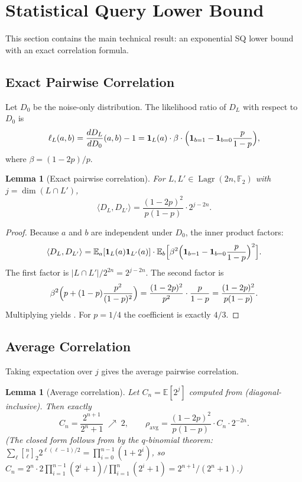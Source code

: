 \documentclass[11pt,a4paper]{article}
\theoremstyle{plain}
\newtheorem{lemma}[theorem]{Lemma}
\theoremstyle{definition}
\newcommand{\F}{\mathbb{F}}
\newcommand{\E}{\mathbb{E}}
\DeclareMathOperator{\Lagr}{Lagr}
\begin{document}
\section{Statistical Query Lower Bound}
\label{sec:sq}

This section contains the main technical result: an exponential SQ lower bound with an exact correlation formula.

\subsection{Exact Pairwise Correlation}
\label{subsec:exact-corr}

Let $D_0$ be the noise-only distribution. The likelihood ratio of $D_L$ with respect to $D_0$ is
\[
\ell_L(a,b) = \frac{dD_L}{dD_0}(a,b) - 1
            = \mathbf{1}_L(a) \cdot \beta \cdot \Bigl(\mathbf{1}_{b=1} - \mathbf{1}_{b=0} \frac{p}{1-p}\Bigr),
\]
where $\beta = (1-2p)/p$.

\begin{lemma}[Exact pairwise correlation]
\label{lem:exact-corr}
For $L,L' \in \Lagr(2n,\F_2)$ with $j = \dim(L \cap L')$,
\begin{equation}
\label{eq:exact-corr}
\langle D_L, D_{L'} \rangle
= \frac{(1-2p)^2}{p(1-p)} \cdot 2^{j-2n}.
\end{equation}
\end{lemma}

\begin{proof}
Because $a$ and $b$ are independent under $D_0$, the inner product factors:
\[
\langle D_L, D_{L'} \rangle
= \E_a[\mathbf{1}_L(a) \mathbf{1}_{L'}(a)] \cdot
  \E_b\Bigl[\beta^2 \Bigl(\mathbf{1}_{b=1} - \mathbf{1}_{b=0}\frac{p}{1-p}\Bigr)^2\Bigr].
\]
The first factor is $|L \cap L'| / 2^{2n} = 2^{j-2n}$. The second factor is
\[
\beta^2 \Bigl(p + (1-p)\frac{p^2}{(1-p)^2}\Bigr)
= \frac{(1-2p)^2}{p^2} \cdot \frac{p}{1-p}
= \frac{(1-2p)^2}{p(1-p)}.
\]
Multiplying yields . For $p=1/4$ the coefficient is exactly $4/3$.
\end{proof}

\subsection{Average Correlation}
\label{subsec:avg-corr}

Taking expectation over $j$ gives the average pairwise correlation.

\begin{lemma}[Average correlation]
\label{lem:avg-corr}
Let $C_n = \E[2^j]$ computed from  (diagonal-inclusive). Then exactly
\[
C_n = \frac{2^{n+1}}{2^n+1} \;\nearrow\; 2,
\qquad
\rho_{\mathrm{avg}}
= \frac{(1-2p)^2}{p(1-p)} \cdot C_n \cdot 2^{-2n}.
\]
(The closed form follows from  by the $q$-binomial theorem: $\sum_{\ell} {n \brack \ell}_2 2^{\ell(\ell-1)/2} = \prod_{i=0}^{n-1}(1+2^i)$, so $C_n = 2^n \cdot 2\prod_{i=1}^{n-1}(2^i+1) / \prod_{i=1}^{n}(2^i+1) = 2^{n+1}/(2^n+1)$.)
\end{lemma}
\end{document}
